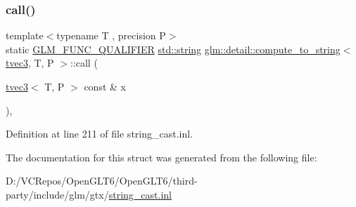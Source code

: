 \subsubsection{\texorpdfstring{call()}{call()}}
{\footnotesize\ttfamily template$<$typename T , precision P$>$ \\
static \mbox{\hyperlink{setup_8hpp_a33fdea6f91c5f834105f7415e2a64407}{G\+L\+M\+\_\+\+F\+U\+N\+C\+\_\+\+Q\+U\+A\+L\+I\+F\+I\+ER}} \mbox{\hyperlink{glad_8h_ac83513893df92266f79a515488701770}{std\+::string}} \mbox{\hyperlink{structglm_1_1detail_1_1compute__to__string}{glm\+::detail\+::compute\+\_\+to\+\_\+string}}$<$ \mbox{\hyperlink{structglm_1_1tvec3}{tvec3}}, T, P $>$\+::call (\begin{DoxyParamCaption}\item[{\mbox{\hyperlink{structglm_1_1tvec3}{tvec3}}$<$ T, P $>$ const \&}]{x }\end{DoxyParamCaption})\hspace{0.3cm}{\ttfamily [inline]}, {\ttfamily [static]}}



Definition at line 211 of file string\+\_\+cast.\+inl.



The documentation for this struct was generated from the following file\+:\begin{DoxyCompactItemize}
\item 
D\+:/\+V\+C\+Repos/\+Open\+G\+L\+T6/\+Open\+G\+L\+T6/third-\/party/include/glm/gtx/\mbox{\hyperlink{string__cast_8inl}{string\+\_\+cast.\+inl}}\end{DoxyCompactItemize}
